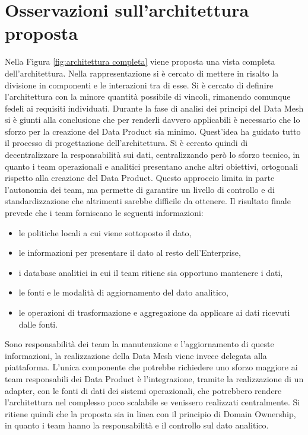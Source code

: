 \documentclass[a4paper,12pt]{report}
\begin{document}
\section{Osservazioni sull'architettura proposta}
Nella Figura \ref{fig:architettura completa} viene proposta una vista completa dell'architettura.
Nella rappresentazione si è cercato di mettere in risalto la divisione in componenti e le interazioni tra di esse.
Si è cercato di definire l'architettura con la minore quantità possibile di vincoli, rimanendo comunque fedeli ai requisiti individuati.
Durante la fase di analisi dei principi del Data Mesh si è giunti alla conclusione che per renderli davvero applicabili è necessario che lo sforzo per la creazione del Data Product sia minimo.
Quest'idea ha guidato tutto il processo di progettazione dell'architettura.
Si è cercato quindi di decentralizzare la responsabilità sui dati, centralizzando però lo sforzo tecnico, in quanto i team operazionali e analitici presentano anche altri obiettivi, ortogonali rispetto alla creazione del Data Product.
Questo approccio limita in parte l'autonomia dei team, ma permette di garantire un livello di controllo e di standardizzazione che altrimenti sarebbe difficile da ottenere.
Il risultato finale prevede che i team forniscano le seguenti informazioni:
\begin{itemize}
    \item le politiche locali a cui viene sottoposto il dato,
    \item le informazioni per presentare il dato al resto dell'Enterprise,
    \item i database analitici in cui il team ritiene sia opportuno mantenere i dati,
    \item le fonti e le modalità di aggiornamento del dato analitico,
    \item le operazioni di trasformazione e aggregazione da applicare ai dati ricevuti dalle fonti.
\end{itemize}
Sono responsabilità dei team la manutenzione e l'aggiornamento di queste informazioni, la realizzazione della Data Mesh viene invece delegata alla piattaforma.
L'unica componente che potrebbe richiedere uno sforzo maggiore ai team responsabili dei Data Product è l'integrazione, tramite la realizzazione di un adapter, con le fonti di dati dei sistemi operazionali, che potrebbero rendere l'architettura nel complesso poco scalabile se venissero realizzati centralmente.
Si ritiene quindi che la proposta sia in linea con il principio di Domain Ownership, in quanto i team hanno la responsabilità  e il controllo sul dato analitico.
\end{document}
